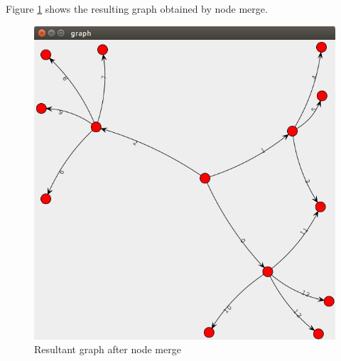 Figure \ref{result} shows the resulting graph obtained by node merge. 
\begin{figure}
 \centerline{
 \includegraphics[width=1.0\columnwidth]{figures/result.png}
 }
 \caption{Resultant graph after node merge \cite{vf2}}
 \label{result}
 \end{figure}
 


